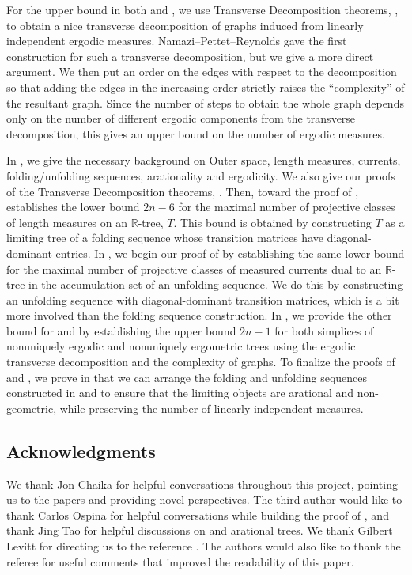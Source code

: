 \documentclass[11pt, letterpaper]{amsart}
\theoremstyle{plain}
\theoremstyle{definition}
\newcommand{\R}{\mathbb{R}}
\begin{document}
For the upper bound in both  and , we use
Transverse Decomposition theorems, , to obtain a nice transverse
decomposition of graphs induced from linearly independent ergodic measures.
Namazi--Pettet--Reynolds \cite{NPR2014} gave the first construction for such a
transverse decomposition, but we give a more direct
argument. We then put an order on the edges
with respect to the decomposition so that adding the edges in the increasing
order strictly raises the ``complexity'' of the resultant graph. Since the number of steps to obtain the
whole graph depends only on the number of different ergodic components from the
transverse decomposition, this gives an upper bound on the number of ergodic
measures.

In , we give the necessary background on Outer space, length
measures, currents,
folding/unfolding sequences, arationality and ergodicity. We also give our proofs
of the Transverse Decomposition theorems, . Then, toward the proof
of ,   establishes the lower bound $2n-6$
for the maximal number of projective classes of length measures on an $\R$-tree, $T$. This bound is obtained by constructing $T$ as a limiting tree of a folding sequence whose transition matrices have diagonal-dominant entries.
 In , we begin our proof of  by establishing the same lower bound for the maximal
number of projective classes of measured currents dual to an $\R$-tree in the
accumulation set of an unfolding sequence. We do this by constructing an unfolding sequence with
diagonal-dominant transition matrices, which is a bit more involved than the
folding sequence construction. In , we provide the other
bound for  and  by establishing the upper bound
$2n-1$ for both simplices of nonuniquely ergodic and nonuniquely ergometric trees using the
ergodic transverse decomposition and the complexity of graphs. To finalize the proofs of
 and , we prove in 
 that we can arrange the folding and unfolding
sequences constructed in  and
 to ensure that the limiting objects are
arational and non-geometric, while preserving the number of linearly independent
measures.

\subsection*{Acknowledgments}
We thank Jon Chaika for helpful conversations throughout this project,
pointing us to the papers \cite{keane1977nonergodic,yoccoz2010interval} and
providing novel perspectives.
The third author would like to thank Carlos Ospina for helpful conversations while building
the proof of , and thank Jing Tao for
helpful discussions on \cite{bestvina2024limit} and arational trees. We
thank Gilbert Levitt for directing us to the reference \cite{levitt1983}. The authors would also like to thank the referee for useful comments that improved the readability of this paper.
\end{document}
